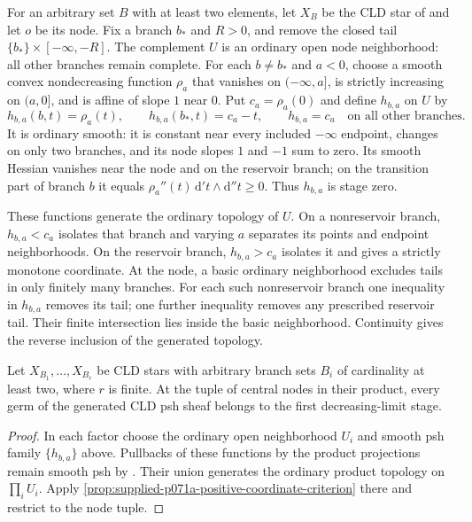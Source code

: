 For an arbitrary set $B$ with at least two elements, let $X_B$ be the CLD star of \cite[\S6.7.3]{CLD25} and let $o$ be its node. Fix a branch $b_*$ and $R>0$, and remove the closed tail $\{b_*\}\times[-\infty,-R]$. The complement $U$ is an ordinary open node neighborhood: all other branches remain complete. For each $b\neq b_*$ and $a<0$, choose a smooth convex nondecreasing function $\rho_a$ that vanishes on $(-\infty,a]$, is strictly increasing on $(a,0]$, and is affine of slope $1$ near $0$. Put $c_a=\rho_a(0)$ and define $h_{b,a}$ on $U$ by
\[
h_{b,a}(b,t)=\rho_a(t),\qquad h_{b,a}(b_*,t)=c_a-t,
\qquad h_{b,a}=c_a\quad\text{on all other branches}.
\]
It is ordinary smooth: it is constant near every included $-\infty$ endpoint, changes on only two branches, and its node slopes $1$ and $-1$ sum to zero. Its smooth Hessian vanishes near the node and on the reservoir branch; on the transition part of branch $b$ it equals $\rho_a''(t)\,\mathrm{d}'t\wedge\mathrm{d}''t\geq0$. Thus $h_{b,a}$ is stage zero.

These functions generate the ordinary topology of $U$. On a nonreservoir branch, $h_{b,a}<c_a$ isolates that branch and varying $a$ separates its points and endpoint neighborhoods. On the reservoir branch, $h_{b,a}>c_a$ isolates it and gives a strictly monotone coordinate. At the node, a basic ordinary neighborhood excludes tails in only finitely many branches. For each such nonreservoir branch one inequality in $h_{b,a}$ removes its tail; one further inequality removes any prescribed reservoir tail. Their finite intersection lies inside the basic neighborhood. Continuity gives the reverse inclusion of the generated topology.

\begin{theorem}
\label{thm:supplied-p071a-arbitrary-star-products}
Let $X_{B_1},\ldots,X_{B_r}$ be CLD stars with arbitrary branch sets $B_i$ of cardinality at least two, where $r$ is finite. At the tuple of central nodes in their product, every germ of the generated CLD psh sheaf belongs to the first decreasing-limit stage.
\end{theorem}

\begin{proof}
In each factor choose the ordinary open neighborhood $U_i$ and smooth psh family $\{h_{b,a}\}$ above. Pullbacks of these functions by the product projections remain smooth psh by \cite[Proposition~8.1.5 and \S9.1.4]{CLD25}. Their union generates the ordinary product topology on $\prod_i U_i$. Apply \cref{prop:supplied-p071a-positive-coordinate-criterion} there and restrict to the node tuple.
\end{proof}
